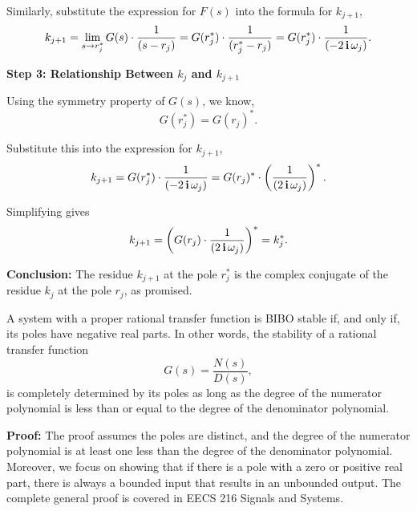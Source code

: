 Similarly, substitute the expression for \(F(s)\) into the formula for \(k_{j+1}\),
\[
k_{j+1} = \lim_{s \to r_j^\ast} G(s) \cdot \frac{1}{(s - r_j)} = G(r_j^\ast) \cdot \frac{1}{(r_j^\ast - r_j)} = G(r_j^\ast) \cdot \frac{1}{(-2 \mathop{\bm{\mathrm i}} \omega_j)}.
\]

\textbf{Step 3: Relationship Between \(k_j\) and \(k_{j+1}\)}  

Using the symmetry property of \(G(s)\), we know,
\[
G(r_j^\ast) = G(r_j)^\ast.
\]

Substitute this into the expression for \(k_{j+1}\),
\[
k_{j+1} = G(r_j^\ast) \cdot \frac{1}{(-2 \mathop{\bm{\mathrm i}} \omega_j)} = G(r_j)^\ast \cdot \left( \frac{1}{(2 \mathop{\bm{\mathrm i}} \omega_j)} \right)^\ast .
\]

Simplifying gives
\[
k_{j+1} = \left(G(r_j) \cdot \frac{1}{(2 \mathop{\bm{\mathrm i}} \omega_j)}\right)^\ast = k_j^\ast.
\]

\textbf{Conclusion:} The residue \(k_{j+1}\) at the pole \(r_j^\ast\) is the complex conjugate of the residue \(k_j\) at the pole \(r_j\), as promised.

\Qed



\bigskip



\bigskip


\begin{tcolorbox}[title=\textcolor{black}{Proof of Prop.~\ref{thm:PolesBIBOStability} (Poles and BIBO Stability)}, sharp corners, colback=green!30, colframe=green!80!blue, breakable, fonttitle=\bfseries]
    A system with a proper rational transfer function is BIBO stable if, and only if, its poles have negative real parts. In other words, the stability of a rational transfer function
    $$G(s) = \frac{N(s)}{D(s)},$$
    is completely determined by its poles as long as the degree of the numerator polynomial is less than or equal to the degree of the denominator polynomial.
\end{tcolorbox}

\textbf{Proof:} The proof assumes the poles are distinct, and the degree of the numerator polynomial is at least one less than the degree of the denominator polynomial. Moreover, we focus on showing that if there is a pole with a zero or positive real part, there is always a bounded input that results in an unbounded output. The complete general proof is covered in EECS 216 Signals and Systems.\\

